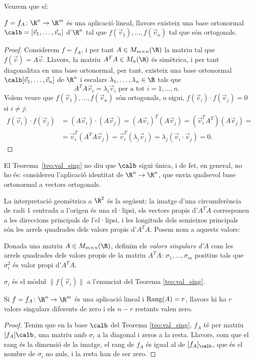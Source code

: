 Veurem que sí:
\begin{teorema}\label{teo:val_sing}
$f=f_A\colon \R^n \to \R^m$ és una aplicació lineal, llavors existeix una base ortonormal $\calb=[\vec v_1, \dots, \vec v_n]$ d'$\R^n$ tal que $f(\vec v_1), \dots, f(\vec v_n)$ tal que són ortogonals.
\end{teorema}
\begin{proof}
Considerem $f=f_A$, i per tant $A\in M_{m\times n}(\R)$ la matriu tal que $f(\vec v)=A\vec v$. Llavors, la matriu $A^TA\in M_n(\R)$ és simètrica, i per tant diagonalitza en una base ortonormal, per tant, existeix una base ortonormal $\calb[\vec v_1, \dots, \vec v_n]$ de $\R^n$ i escalars $\lambda_1, \dots, \lambda_n\in \R$ tals que
\[
A^T A \vec v_i=\lambda_i \vec v_i \text{ per a tot $i=1, \dots, n$.}
\]
Volem veure que $f(\vec v_1), \dots, f(\vec v_n)$ són ortogonals, o sigui, $f(\vec v_i)\cdot f(\vec v_j)=0$ si $i\neq j$:
\begin{align*}
f(\vec v_i)\cdot f(\vec v_j) & =(A\vec v_i)\cdot(A\vec v_j)=(A\vec v_i)^T(A\vec v_j)=(\vec v_i^T A^T)(A \vec v_j)= \\
 &  = \vec v_i^T (A^T A \vec v_j)=\vec v_i^T (\lambda_j \vec v_j)=\lambda_j (\vec v_i \cdot \vec v_j)=0 .
\end{align*}
\end{proof}
\begin{observacio}
El Teorema~\ref{teo:val_sing} no diu que $\calb$ sigui única, i de fet, en general, no ho és: considereu l'aplicació identitat de $\R^n \to \R^n$, que envia qualsevol base ortonormal a vectors ortogonals.
\end{observacio}

 La interpretació geomètrica a $\R^2$ és la següent: la imatge d'una circumferència de radi $1$ centrada a l'origen és una el·lipsi, els vectors propis d'$A^TA$ corresponen a les direccions principals de l'el·lipsi, i les longituds dels semieixos principals són les arrels quadrades dels valors propis d'$A^TA$. Posem nom a aquests valors:
 \begin{definicio}
 Donada una matriu $A\in M_{m\times n}(\R)$, definim els \emph{valors singulars d'$A$} com les arrels quadrades dels valors propis de la matriu $A^TA$: $\sigma_1, \dots, \sigma_m$ positius tals que $\sigma_i^2$ és valor propi d'$A^TA$.
 \end{definicio}
 \begin{observacio}
 $\sigma_i$ és el mòdul $\|f(\vec v_i)\|$ a l'enunciat del Teorema \ref{teo:val_sing}.
 \end{observacio}
 \begin{proposicio}
 Si $f=f_A\colon \R^n \to \R^m$ és una aplicació lineal i $\operatorname{Rang}(A)=r$, llavors hi ha $r$ valors singulars diferents de zero i els $n-r$ restants valen zero.
 \end{proposicio}
\begin{proof}
Tenim que en la base $\calb$ del Teorema \ref{teo:val_sing}, $f_A$ té per matriu $[f_A]\calb$, una matriu amb $\sigma_i$ a la diagonal i zeros a la resta. Llavors, com que el rang és la dimensió de la imatge, el rang de $f_A$  és igual al de $[f_A]_\calb$, que és el nombre de $\sigma_i$ no nuls, i la resta han de ser zero.
\end{proof}

